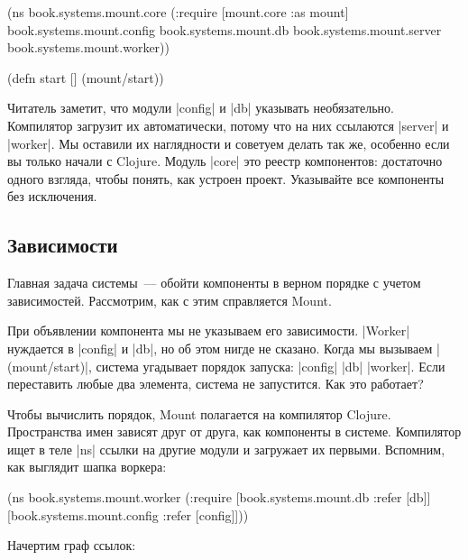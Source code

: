 \begin{english}
  \begin{clojure}
(ns book.systems.mount.core
  (:require
   [mount.core :as mount]
   book.systems.mount.config
   book.systems.mount.db
   book.systems.mount.server
   book.systems.mount.worker))

(defn start []
  (mount/start))
  \end{clojure}
\end{english}

Читатель заметит, что модули \spverb|config| и \spverb|db| указывать
необязательно. Компилятор загрузит их автоматически, потому что на них ссылаются
\spverb|server| и \spverb|worker|. Мы оставили их наглядности и советуем делать
так же, особенно если вы только начали с Clojure. Модуль \spverb|core| это
реестр компонентов: достаточно одного взгляда, чтобы понять, как устроен
проект. Указывайте все компоненты без исключения.

\subsection{Зависимости}

Главная задача системы~--- обойти компоненты в верном порядке с учетом
зависимостей. Рассмотрим, как с этим справляется Mount.

При объявлении компонента мы не указываем его зависимости. \spverb|Worker|
нуждается в \spverb|config| и \spverb|db|, но об этом нигде не сказано. Когда мы
вызываем \spverb|(mount/start)|, система угадывает порядок запуска:
\spverb|config| \arr{} \spverb|db| \arr{} \spverb|worker|. Если переставить
любые два элемента, система не запустится. Как это работает?

Чтобы вычислить порядок, Mount полагается на компилятор Clojure. Пространства
имен зависят друг от друга, как компоненты в системе. Компилятор ищет в теле
\spverb|ns| ссылки на другие модули и загружает их первыми. Вспомним, как
выглядит шапка воркера:

\begin{english}
  \begin{clojure}
(ns book.systems.mount.worker
  (:require
   [book.systems.mount.db :refer [db]]
   [book.systems.mount.config :refer [config]]))
  \end{clojure}
\end{english}

\noindent
Начертим граф ссылок:


